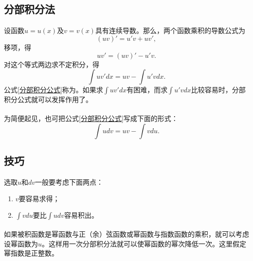 \subsection{分部积分法}
\paragraph{}
设函数$u=u(x)$及$v=v(x)$具有连续导数。那么，两个函数乘积的导数公式为
\begin{equation}
  (uv)' = u'v + uv',
\end{equation}
移项，得
\begin{equation}
  uv' = (uv)' - u'v.
\end{equation}
对这个等式两边求不定积分，得
\begin{equation}
  \label{分部积分公式}
  \int uv'dx = uv - \int u'vdx.
\end{equation}
公式\eqref{分部积分公式}称为。如果求$\displaystyle \int uv'dx$有困难，而求$\displaystyle \int u'vdx$比较容易时，分部积分公式就可以发挥作用了。

\paragraph{}
为简便起见，也可把公式\eqref{分部积分公式}写成下面的形式：
\begin{equation}
  \int udv = uv - \int vdu.
\end{equation}

\subsection{技巧}
\paragraph{}
选取$u$和$dv$一般要考虑下面两点：
\begin{enumerate}
  \item $v$要容易求得；
  \item $\displaystyle \int vdu$要比$\displaystyle \int udv$容易积出。
\end{enumerate}

\paragraph{}
如果被积函数是幂函数与正（余）弦函数或幂函数与指数函数的乘积，就可以考虑设幂函数为$u$。这样用一次分部积分法就可以使幂函数的幂次降低一次。这里假定幂指数是正整数。

